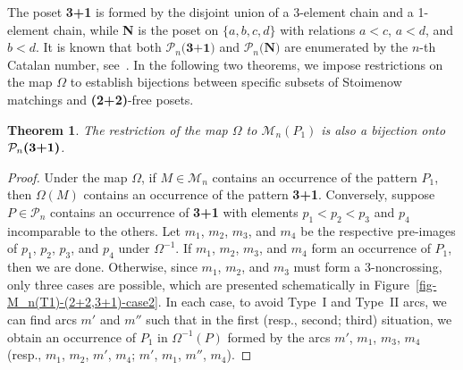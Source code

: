\documentclass[11pt]{article}
\newtheorem{thm}{Theorem}[section]
\newcommand{\M}{\mathcal{M}}
\begin{document}
	The poset \textbf{3+1} is formed by the disjoint union of a 3-element chain and a 1-element chain, while \textbf{N} is the poset on $\{a,b,c,d\}$ with relations $a < c$, $a < d$, and $b < d$.  It is known that both $\mathcal{P}_n\textbf{(3+1)}$ and $\mathcal{P}_n\textbf{(N)}$ are enumerated by the $n$-th Catalan number, see~\cite{Disanto-Ferrari-Pinzani-Rinaldi, Stanley}. In the following two theorems, we impose restrictions on the map $\Omega$ to establish bijections between specific subsets of Stoimenow matchings and \textbf{(2+2)}-free posets.
	
	\begin{thm} \label{thm-P1-Poset3+1}
		The restriction of the map $\Omega$ to $\M_n(P_1)$ is also a bijection onto $\mathcal{P}_n\text{{\bf (3+1)}}$.   
	\end{thm}
	\begin{proof}
		Under the map $\Omega$, if $M\in\M_n$ contains an occurrence of the pattern $P_1$, then $\Omega(M)$ contains an occurrence of the pattern \textbf{3+1}. 
		Conversely, suppose $P \in \mathcal{P}_n$ contains an  occurrence of \textbf{3+1} with elements $p_1 < p_2 < p_3$ and $p_4$ incomparable to the others. Let $m_1$, $m_2$, $m_3$, and $m_4$ be the respective pre-images of $p_1$, $p_2$, $p_3$, and $p_4$ under $\Omega^{-1}$. If $m_1$, $m_2$, $m_3$, and $m_4$ form an occurrence of $P_1$, then we are done. Otherwise, since $m_1$, $m_2$, and $m_3$ must form a 3-noncrossing, only three cases are possible, which are presented schematically in Figure~\ref{fig-M_n(T1)-(2+2,3+1)-case2}. In each case, to avoid Type~I and Type~II arcs, we can find arcs $m'$ and $m''$ such that in the first (resp., second; third) situation, we obtain an occurrence of $P_1$ in $\Omega^{-1}(P)$ formed by the arcs $m'$, $m_1$, $m_3$, $m_4$ (resp., $m_1$, $m_2$, $m'$, $m_4$; $m'$, $m_1$, $m''$, $m_4$).  \end{proof}
	
\end{document}
